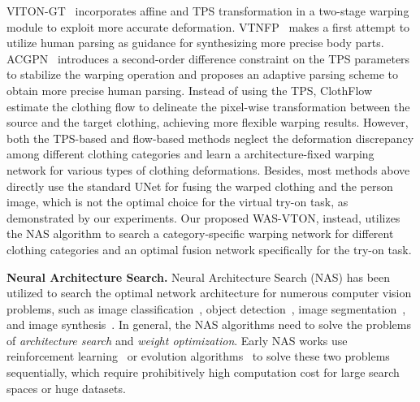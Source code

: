 \documentclass[sigconf]{acmart}
\begin{document}
VITON-GT~\cite{fancato2020viton-gt} incorporates affine and TPS transformation in a two-stage warping module to exploit more accurate deformation.
VTNFP~\cite{yun2019vtnfp} makes a first attempt to utilize human parsing as guidance for synthesizing more precise body parts.
ACGPN~\cite{han2020acgpn} introduces a second-order difference constraint on the TPS parameters to stabilize the warping operation and proposes an adaptive parsing scheme to obtain more precise human parsing. 
Instead of using the TPS, ClothFlow~\cite{xintong2019clothflow} estimate the clothing flow to delineate the pixel-wise transformation between the source and the target clothing, achieving more flexible warping results.
However, both the TPS-based and flow-based methods neglect the deformation discrepancy among different clothing categories and learn a architecture-fixed warping network for various types of clothing deformations.
Besides, most methods above directly use the standard UNet for fusing the warped clothing and the person image, which is not the optimal choice for the virtual try-on task, as demonstrated by our experiments.
Our proposed WAS-VTON, instead, utilizes the NAS algorithm to search a category-specific warping network for different clothing categories and an optimal fusion network specifically for the try-on task.

\textbf{Neural Architecture Search.}
Neural Architecture Search (NAS) has been utilized to search the optimal network architecture for numerous computer vision problems, such as image classification~\cite{liu2018dasrts,bender2018oneshot,zichao2019singlepath,xu2019pc-darts,li2020dna,tan2019efficientnet}, object detection~\cite{peng2019clod,ghiasi2019nasfpn,jing2020sanas,wang2020nasfcos,wang2020efficientdet}, image segmentation~\cite{liu2019auto-deeplab,zhang2019cas}, and image synthesis~\cite{gao2019adversarialnas,gong2019autogan}.
In general, the NAS algorithms need to solve the problems of \textit{architecture search} and \textit{weight optimization}. Early NAS works use reinforcement learning~\cite{barret2016naslr,barret2018lta} or evolution algorithms~\cite{xie2017genetic} to solve these two problems sequentially, which require prohibitively high computation cost for large search spaces or huge datasets. 
\end{document}
